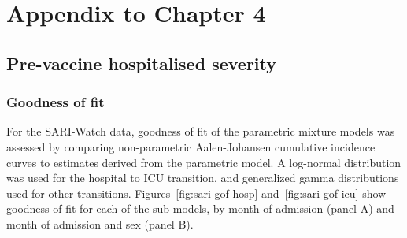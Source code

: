 \chapter{Appendix to Chapter 4}\label{appx:hospitalseverity}

\graphicspath{{03_HospitalSeverity/Figs/}}

\section{Pre-vaccine hospitalised severity}

\begingroup\footnotesize

\endgroup

\subsection{Goodness of fit}\label{appendix:sari-gof}

For the SARI-Watch data, goodness of fit of the parametric mixture models was assessed by comparing non-parametric Aalen-Johansen cumulative incidence curves to estimates derived from the parametric model. A log-normal distribution was used for the hospital to ICU transition, and generalized gamma distributions used for other transitions. Figures~\ref{fig:sari-gof-hosp} and~\ref{fig:sari-gof-icu} show goodness of fit for each of the sub-models, by month of admission (panel A) and month of admission and sex (panel B).

